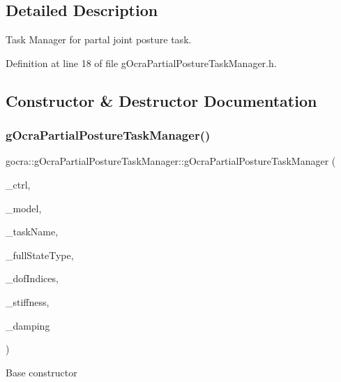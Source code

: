 \subsection{Detailed Description}
Task Manager for partal joint posture task. 



Definition at line 18 of file g\+Ocra\+Partial\+Posture\+Task\+Manager.\+h.



\subsection{Constructor \& Destructor Documentation}
\hypertarget{classgocra_1_1gOcraPartialPostureTaskManager_afd597f38d4ee2dfb05606959bf90757f}{}\label{classgocra_1_1gOcraPartialPostureTaskManager_afd597f38d4ee2dfb05606959bf90757f} 
\subsubsection{\texorpdfstring{g\+Ocra\+Partial\+Posture\+Task\+Manager()}{gOcraPartialPostureTaskManager()}\hspace{0.1cm}{\footnotesize\ttfamily [1/2]}}
{\footnotesize\ttfamily gocra\+::g\+Ocra\+Partial\+Posture\+Task\+Manager\+::g\+Ocra\+Partial\+Posture\+Task\+Manager (\begin{DoxyParamCaption}\item[{\hyperlink{classgocra_1_1GHCJTController}{G\+H\+C\+J\+T\+Controller} \&}]{\+\_\+ctrl,  }\item[{const \hyperlink{classocra_1_1Model}{ocra\+::\+Model} \&}]{\+\_\+model,  }\item[{const std\+::string \&}]{\+\_\+task\+Name,  }\item[{int}]{\+\_\+full\+State\+Type,  }\item[{Eigen\+::\+Vector\+Xi \&}]{\+\_\+dof\+Indices,  }\item[{double}]{\+\_\+stiffness,  }\item[{double}]{\+\_\+damping }\end{DoxyParamCaption})}

Base constructor


